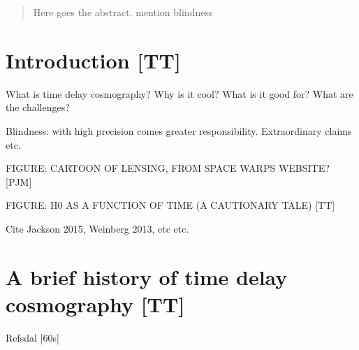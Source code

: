 \date{Received: date / Accepted: date}

\maketitle


\begin{abstract}

Here goes the abstract. mention blindness


\end{abstract}


\section{Introduction [TT]}
\label{sec:intro}


What is time delay cosmography? Why is it cool? What is it good for?
What are the challenges? 

Blindness: with high precision comes greater
responsibility. Extraordinary claims etc.

FIGURE: CARTOON OF LENSING, FROM SPACE WARPS WEBSITE? [PJM]

FIGURE: H0 AS A FUNCTION OF TIME (A CAUTIONARY TALE) [TT]

Cite Jackson 2015, Weinberg 2013, etc etc.


\section{A brief history of time delay cosmography [TT]}
\label{sec:history}






Refsdal [60s]

